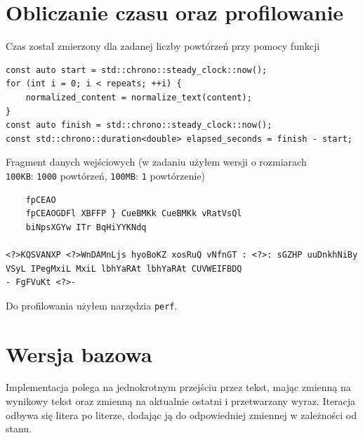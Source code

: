 \documentclass[12pt]{article}
\begin{document}
\newpage

\section*{Obliczanie czasu oraz profilowanie}
Czas został zmierzony dla zadanej liczby powtórzeń przy pomocy funkcji
\begin{verbatim}
const auto start = std::chrono::steady_clock::now();
for (int i = 0; i < repeats; ++i) {
	normalized_content = normalize_text(content);
}
const auto finish = std::chrono::steady_clock::now();
const std::chrono::duration<double> elapsed_seconds = finish - start;
\end{verbatim}

Fragment danych wejściowych (w zadaniu użyłem wersji o rozmiarach \\
\verb|100KB|: \verb|1000| powtórzeń, \verb|100MB|: \verb|1| powtórzenie)

\begin{verbatim}
	fpCEAO 
	fpCEAOGDFl XBFFP } CueBMKk CueBMKk vRatVsQl 	
	biNpsXGYw ITr BqHiYYKNdq 

<?>KQSVANXP <?>WnDAMnLjs hyoBoKZ xosRuQ vNfnGT : <?>: sGZHP uuDnkhNiBy 	 
VSyL IPegMxiL MxiL lbhYaRAt lbhYaRAt CUVWEIFBDQ 
- FgFVuKt <?>-
\end{verbatim}

Do profilowania użyłem narzędzia \verb|perf|.











\section*{Wersja bazowa}
Implementacja polega na jednokrotnym przejściu przez tekst, mając zmienną
na wynikowy tekst oraz zmienną na aktualnie ostatni i przetwarzany wyraz.
Iteracja odbywa się litera po literze, dodając ją do odpowiedniej zmiennej
w zależności od stanu. 
\end{document}
